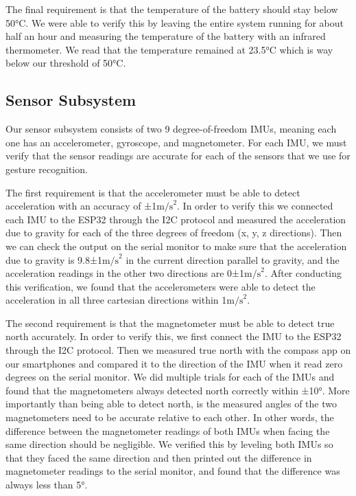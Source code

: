 The final requirement is that the temperature of the battery should stay below 50°C. We were able to verify this by leaving the entire system running for about half an hour and measuring the temperature of the battery with an infrared thermometer. We read that the temperature remained at 23.5°C which is way below our threshold of 50°C.

\subsection{Sensor Subsystem}
Our sensor subsystem consists of two 9 degree-of-freedom IMUs, meaning each one has an accelerometer, gyroscope, and magnetometer. For each IMU, we must verify that the sensor readings are accurate for each of the sensors that we use for gesture recognition. 

The first requirement is that the accelerometer must be able to detect acceleration with an accuracy of ±1$\text{m/s}^2$. In order to verify this we connected each IMU to the ESP32 through the I2C protocol and measured the acceleration due to gravity for each of the three degrees of freedom (x, y, z directions). Then we can check the output on the serial monitor to make sure that the acceleration due to gravity is 9.8±1$\text{m/s}^2$ in the current direction parallel to gravity, and the acceleration readings in the other two directions are 0±1$\text{m/s}^2$. After conducting this verification, we found that the accelerometers were able to detect the acceleration in all three cartesian directions within 1$\text{m/s}^2$.

The second requirement is that the magnetometer must be able to detect true north accurately. In order to verify this, we first connect the IMU to the ESP32 through the I2C protocol. Then we measured true north with the compass app on our smartphones and compared it to the direction of the IMU when it read zero degrees on the serial monitor. We did multiple trials for each of the IMUs and found that the magnetometers always detected north correctly within ±10°. More importantly than being able to detect north, is the measured angles of the two magnetometers need to be accurate relative to each other. In other words, the difference between the magnetometer readings of both IMUs when facing the same direction should be negligible. We verified this by leveling both IMUs so that they faced the same direction and then printed out the difference in magnetometer readings to the serial monitor, and found that the difference was always less than 5°. 

